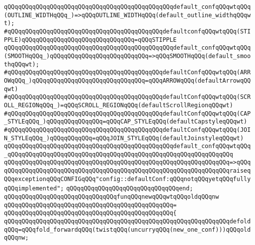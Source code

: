 \verb|qQQqqQQqqQQqqQQqqQQqqQQqqQQqqQQqqQQqqQQqqQQqqQQqdefault_confqQQqwtqQQq(OUTLINE_WIDTHqQQq_)=>qQQqOUTLINE_WIDTHqQQq(default_outline_widthqQQqwt);|\newline
\verb|#qQQqqQQqqQQqqQQqqQQqqQQqqQQqqQQqqQQqqQQqqQQqdefaultconfqQQqwtqQQq(STIPPLE)qQQqqQQqqQQqqQQqqQQqqQQqqQQqqQQq=qQQqSTIPPLE|\newline
\verb|qQQqqQQqqQQqqQQqqQQqqQQqqQQqqQQqqQQqqQQqqQQqqQQqdefault_confqQQqwtqQQq(SMOOTHqQQq_)qQQqqQQqqQQqqQQqqQQqqQQqqQQq=>qQQqSMOOTHqQQq(default_smoothqQQqwt);|\newline
\verb|#qQQqqQQqqQQqqQQqqQQqqQQqqQQqqQQqqQQqqQQqqQQqdefaultConfqQQqwtqQQq(ARROWqQQq_)qQQqqQQqqQQqqQQqqQQqqQQqqQQqqQQq=qQQqARROWqQQq(defaultArrowqQQqwt)|\newline
\verb|#qQQqqQQqqQQqqQQqqQQqqQQqqQQqqQQqqQQqqQQqqQQqdefaultConfqQQqwtqQQq(SCROLL_REGIONqQQq_)=qQQqSCROLL_REGIONqQQq(defaultScrollRegionqQQqwt)|\newline
\verb|#qQQqqQQqqQQqqQQqqQQqqQQqqQQqqQQqqQQqqQQqqQQqdefaultConfqQQqwtqQQq(CAP_STYLEqQQq_)qQQqqQQqqQQqqQQq=qQQqCAP_STYLEqQQq(defaultCapstyleqQQqwt)|\newline
\verb|#qQQqqQQqqQQqqQQqqQQqqQQqqQQqqQQqqQQqqQQqqQQqdefaultConfqQQqwtqQQq(JOIN_STYLEqQQq_)qQQqqQQqqQQq=qQQqJOIN_STYLEqQQq(defaultJoinstyleqQQqwt)|\newline
\newline
\verb|qQQqqQQqqQQqqQQqqQQqqQQqqQQqqQQqqQQqqQQqqQQqqQQqdefault_confqQQqwtqQQq_qQQqqQQqqQQqqQQqqQQqqQQqqQQqqQQqqQQqqQQqqQQqqQQqqQQqqQQqqQQqqQQq|\newline
\verb|qQQqqQQqqQQqqQQqqQQqqQQqqQQqqQQqqQQqqQQqqQQqqQQqqQQqqQQqqQQqqQQq=>qQQq|\newline
\verb|qQQqqQQqqQQqqQQqqQQqqQQqqQQqqQQqqQQqqQQqqQQqqQQqqQQqqQQqqQQqqQQqraiseqQQqexceptionqQQqCONFIGqQQq"config::defaultConf:qQQqnotqQQqyetqQQqfullyqQQqimplemented";|\newline
\verb|qQQqqQQqqQQqqQQqqQQqqQQqqQQqqQQqend;|\newline
\newline
\verb|qQQqqQQqqQQqqQQqqQQqqQQqqQQqqQQqfunqQQqnewqQQqwtqQQqoldqQQqnw|\newline
\verb|qQQqqQQqqQQqqQQqqQQqqQQqqQQqqQQqqQQqqQQqqQQqqQQq=|\newline
\verb|qQQqqQQqqQQqqQQqqQQqqQQqqQQqqQQqqQQqqQQqqQQqqQQq{|\newline
\verb|qQQqqQQqqQQqqQQqqQQqqQQqqQQqqQQqqQQqqQQqqQQqqQQqqQQqqQQqqQQqqQQqdefoldqQQq=qQQqfold_forwardqQQq(twistqQQq(uncurryqQQq(new_one_conf)))qQQqoldqQQqnw;|\newline
